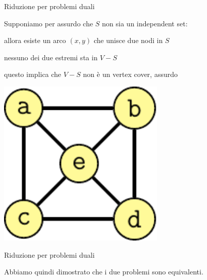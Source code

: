\begin{frame}{Riduzione per problemi duali}

\vspace{-9pt}
Supponiamo per assurdo che $S$ non sia un independent set:
\BI
\item allora esiste un arco $(x,y)$ che unisce due nodi in $S$
\item nessuno dei due estremi sta in $V-S$
\item questo implica che $V-S$ non è un vertex cover, assurdo
\EI

\begin{center}
\includegraphics[width=0.6\textwidth,page=3]{cover.pdf}
\end{center}

\end{frame}

\begin{frame}{Riduzione per problemi duali}

\vspace{-9pt}
Abbiamo quindi dimostrato che i due problemi sono equivalenti.

\end{frame}

